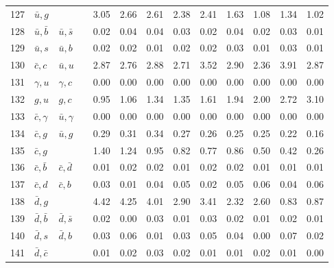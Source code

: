 \begin{tabularx}{\textwidth}{rXXX@{}S@{}S@{}S@{}S@{}S@{}S@{}S@{}S@{}S}
127 & $\bar u, g$      &                   &                  &  3.05 &  2.66 &  2.61 &  2.38 &  2.41 &  1.63 &  1.08 &  1.34 &  1.02 \\
128 & $\bar u, \bar b$ & $\bar u, \bar s$  &                  &  0.02 &  0.04 &  0.04 &  0.03 &  0.02 &  0.04 &  0.02 &  0.03 &  0.01 \\
129 & $\bar u, s$      & $\bar u, b$       &                  &  0.02 &  0.02 &  0.01 &  0.02 &  0.02 &  0.03 &  0.01 &  0.03 &  0.01 \\
130 & $\bar c, c$      & $\bar u, u$       &                  &  2.87 &  2.76 &  2.88 &  2.71 &  3.52 &  2.90 &  2.36 &  3.91 &  2.87 \\
131 & $\gamma, u$      & $\gamma, c$       &                  &  0.00 &  0.00 &  0.00 &  0.00 &  0.00 &  0.00 &  0.00 &  0.00 &  0.00 \\
132 & $g, u$           & $g,  c$           &                  &  0.95 &  1.06 &  1.34 &  1.35 &  1.61 &  1.94 &  2.00 &  2.72 &  3.10 \\
133 & $\bar c, \gamma$ & $\bar u, \gamma$  &                  &  0.00 &  0.00 &  0.00 &  0.00 &  0.00 &  0.00 &  0.00 &  0.00 &  0.00 \\
134 & $\bar c, g$      & $\bar u, g$       &                  &  0.29 &  0.31 &  0.34 &  0.27 &  0.26 &  0.25 &  0.25 &  0.22 &  0.16 \\
135 & $\bar c, g$      &                   &                  &  1.40 &  1.24 &  0.95 &  0.82 &  0.77 &  0.86 &  0.50 &  0.42 &  0.26 \\
136 & $\bar c, \bar b$ & $\bar c, \bar d$  &                  &  0.01 &  0.02 &  0.02 &  0.01 &  0.02 &  0.02 &  0.01 &  0.01 &  0.01 \\
137 & $\bar c, d$      & $\bar c, b$       &                  &  0.03 &  0.01 &  0.04 &  0.05 &  0.02 &  0.05 &  0.06 &  0.04 &  0.06 \\
138 & $\bar d, g$      &                   &                  &  4.42 &  4.25 &  4.01 &  2.90 &  3.41 &  2.32 &  2.60 &  0.83 &  0.87 \\
139 & $\bar d, \bar b$ & $\bar d, \bar s$  &                  &  0.02 &  0.00 &  0.03 &  0.01 &  0.03 &  0.02 &  0.01 &  0.02 &  0.01 \\
140 & $\bar d, s$      & $\bar d, b$       &                  &  0.03 &  0.06 &  0.01 &  0.03 &  0.05 &  0.04 &  0.00 &  0.07 &  0.02 \\
141 & $\bar d, \bar c$ &                   &                  &  0.01 &  0.02 &  0.03 &  0.02 &  0.01 &  0.01 &  0.02 &  0.01 &  0.00 \\

\end{tabularx}
